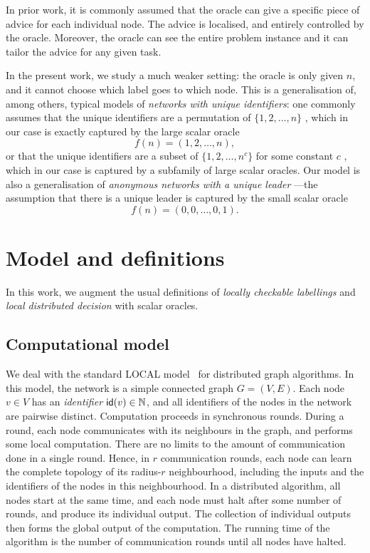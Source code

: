 \documentclass[11pt,a4paper]{article}
\theoremstyle{definition}
\theoremstyle{remark}
\newcommand{\id}{\text{\sf id}}
\begin{document}
In prior work, it is commonly assumed that the oracle can give a specific piece of advice for each individual node. The advice is localised, and entirely controlled by the oracle. Moreover, the oracle can see the entire problem instance and it can tailor the advice for any given task.

In the present work, we study a much weaker setting: the oracle is only given $n$, and it cannot choose which label goes to which node. This is a generalisation of, among others, typical models of \emph{networks with unique identifiers}: one commonly assumes that the unique identifiers are a permutation of $\{1,2,\dotsc,n\}$ \cite{linial92locality}, which in our case is exactly captured by the large scalar oracle
\[
    f(n) = (1,2,\dotsc,n),
\]
or that the unique identifiers are a subset of $\{1,2,\dotsc,n^c\}$ for some constant $c$ \cite{peleg00distributed}, which in our case is captured by a subfamily of large scalar oracles. Our model is also a generalisation of \emph{anonymous networks with a unique leader} \cite{fraigniaud01labels}---the assumption that there is a unique leader is captured by the small scalar oracle
\[
    f(n) = (0,0,\dotsc,0,1).
\]


\section{Model and definitions}

In this work, we augment the usual definitions of \emph{locally checkable labellings} \cite{naor95what} and \emph{local distributed decision} \cite{fraigniaud11ld,fraigniaud12impact,fraigniaud13ld-id} with scalar oracles.

\subsection{Computational model}

We deal with the standard \textsf{LOCAL} model~\cite{peleg00distributed} for distributed graph algorithms. In this model, the network is a simple connected graph $G = (V,E)$. Each node $v\in V$ has an \emph{identifier} $\id(v)\in\mathbb{N}$, and all identifiers of the nodes in the network are pairwise distinct. Computation proceeds in synchronous rounds. During a round, each node communicates with its neighbours in the graph, and performs some local computation. There are no limits to the amount of communication done in a single round. Hence, in $r$ communication rounds, each node can learn the complete topology of its radius-$r$ neighbourhood, including the inputs and the identifiers of the nodes in this neighbourhood. In a distributed algorithm, all nodes start at the same time, and each node must halt after some number of rounds, and produce its individual output. The collection of individual outputs then forms the global output of the computation. The running time of the algorithm is the number of communication rounds until all nodes have halted. 
\end{document}

